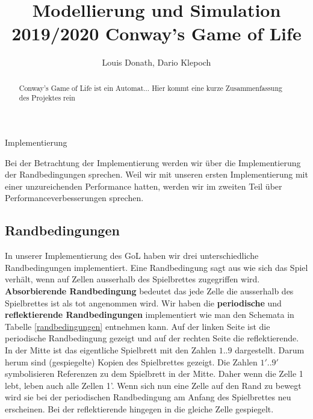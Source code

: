 \documentclass[runningheads]{llncs}
\begin{document}
%
\title{Modellierung und Simulation 2019/2020 Conway's Game of Life}
\author{Louis Donath, Dario Klepoch}
%
\authorrunning{}


\maketitle              

\begin{abstract}
Conway's Game of Life ist ein Automat...
Hier kommt eine kurze Zusammenfassung des Projektes rein
\end{abstract}
%


\begin{section}{Implementierung}
    
    Bei der Betrachtung der Implementierung werden wir über die Implementierung der Randbedingungen sprechen.
    Weil wir mit unseren ersten Implementierung mit einer unzureichenden Performance hatten,
    werden wir im zweiten Teil über Performanceverbesserungen sprechen.

    \subsection{Randbedingungen}
        In unserer Implementierung des GoL haben wir drei unterschiedliche Randbedingungen implementiert.
        Eine Randbedingung sagt aus wie sich das Spiel verhält, wenn auf Zellen ausserhalb des Spielbrettes zugegriffen wird. \newline
        \textbf{Absorbierende Randbedingung} bedeutet das jede Zelle die ausserhalb des Spielbrettes ist als tot angenommen wird.\newline
        Wir haben die \textbf{periodische} und \textbf{reflektierende Randbedingungen} implementiert wie man den Schemata in Tabelle \ref{randbedingungen} entnehmen kann.
        Auf der linken Seite ist die periodische Randbedingung gezeigt und auf der rechten Seite die reflektierende.
        In der Mitte ist das eigentliche Spielbrett mit den Zahlen $1..9$ dargestellt.
        Darum herum sind (gespiegelte) Kopien des Spielbrettes gezeigt.
        Die Zahlen $1'..9'$ symbolisieren Referenzen zu dem Spielbrett in der Mitte.
        Daher wenn die Zelle 1 lebt, leben auch alle Zellen 1'.
        Wenn sich nun eine Zelle auf den Rand zu bewegt wird sie bei der periodischen Randbedingung am Anfang des Spielbrettes neu erscheinen.
        Bei der reflektierende hingegen in die gleiche Zelle gespiegelt.



\end{section}
\end{document}
